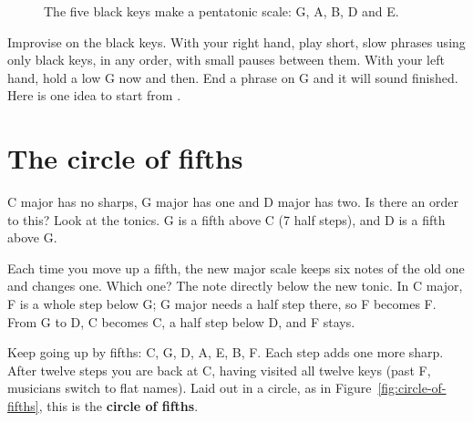\begin{figure}[htbp]
\centering
{}
\caption{The five black keys make a pentatonic scale: G\fl, A\fl, B\fl, D\fl{} and E\fl.}
\label{fig:black-key-pentatonic}
\end{figure}

\begin{tryitbox}
Improvise on the black keys. With your right hand, play short, slow phrases using only black keys, in any order, with small pauses between them. With your left hand, hold a low G\fl{} now and then. End a phrase on G\fl{} and it will sound finished. Here is one idea to start from .
\end{tryitbox}

\section{The circle of fifths}

C major has no sharps, G major has one and D major has two. Is there an order to this? Look at the tonics. G is a fifth above C (7 half steps), and D is a fifth above G.

Each time you move up a fifth, the new major scale keeps six notes of the old one and changes one. Which one? The note directly below the new tonic. In C major, F is a whole step below G; G major needs a half step there, so F becomes F\sh. From G to D, C becomes C\sh, a half step below D, and F\sh{} stays.

Keep going up by fifths: C, G, D, A, E, B, F\sh. Each step adds one more sharp. After twelve steps you are back at C, having visited all twelve keys (past F\sh, musicians switch to flat names). Laid out in a circle, as in Figure~\ref{fig:circle-of-fifths}, this is the \textbf{circle of fifths}.

